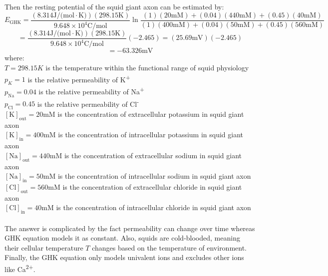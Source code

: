 \documentclass{article}
\begin{document}
Then the resting potential of the squid giant axon can be estimated by:
$$E_{\text{GHK}} = \frac{(8.314\text{J/(mol}\cdot\text{K)})(298.15\text{K})}{9.648\times10^4\text{C/mol}}\ln\frac{(1)(20\text{mM}) + (0.04)(440\text{mM}) + (0.45)(40\text{mM})}{(1)(400\text{mM}) + (0.04)(50\text{mM}) + (0.45)(560\text{mM})}$$
$$= \frac{(8.314\text{J/(mol}\cdot\text{K)})(298.15\text{K})}{9.648\times10^4\text{C/mol}}(-2.465) = (25.69\text{mV})(-2.465)$$
$$= \boxed{-63.326\text{mV}}$$
where: \\
$T = 298.15K$ is the temperature within the functional range of squid physiology \\ 
$p_K = 1$ is the relative permeability of K\textsuperscript{+} \\
$p_\text{Na} = 0.04$ is the relative permeability of Na\textsuperscript{+} \\
$p_\text{Cl} = 0.45$ is the relative permeability of Cl\textsuperscript{-} \\
$[\text{K}]_{\text{out}} = 20\text{mM}$ is the concentration of extracellular potassium in squid giant axon \\
$[\text{K}]_{\text{in}} = 400\text{mM}$ is the concentration of intracellular potassium in squid giant axon \\
$[\text{Na}]_{\text{out}} = 440\text{mM}$ is the concentration of extracellular sodium in squid giant axon \\
$[\text{Na}]_{\text{in}} = 50\text{mM}$ is the concentration of intracellular sodium in squid giant axon \\
$[\text{Cl}]_{\text{out}} = 560\text{mM}$ is the concentration of extracellular chloride in squid giant axon \\
$[\text{Cl}]_{\text{in}} = 40\text{mM}$ is the concentration of intracellular chloride in squid giant axon \\
\\

The answer is complicated by the fact permeability can change over time whereas GHK equation models it as constant.
Also, squids are cold-blooded, meaning their cellular temperature $T$ changes based on the temperature of environment.
Finally, the GHK equation only models univalent ions and excludes other ions like Ca\textsuperscript{2+}.
\end{document}
